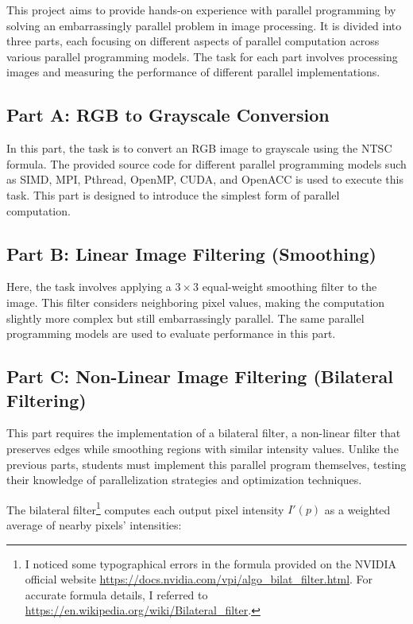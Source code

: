 \documentclass[12pt,a4paper]{report}
\begin{document}
This project aims to provide hands-on experience with parallel programming by solving an embarrassingly parallel problem in image processing. It is divided into three parts, each focusing on different aspects of parallel computation across various parallel programming models. The task for each part involves processing images and measuring the performance of different parallel implementations.

\subsection*{Part A: RGB to Grayscale Conversion} 
    In this part, the task is to convert an RGB image to grayscale using the NTSC formula. The provided source code for different parallel programming models such as SIMD, MPI, Pthread, OpenMP, CUDA, and OpenACC is used to execute this task. This part is designed to introduce the simplest form of parallel computation.

\subsection*{Part B: Linear Image Filtering (Smoothing)} 
    Here, the task involves applying a $ 3 \times 3 $ equal-weight smoothing filter to the image. This filter considers neighboring pixel values, making the computation slightly more complex but still embarrassingly parallel. The same parallel programming models are used to evaluate performance in this part.

\subsection*{Part C: Non-Linear Image Filtering (Bilateral Filtering)} 
    This part requires the implementation of a bilateral filter, a non-linear filter that preserves edges while smoothing regions with similar intensity values. Unlike the previous parts, students must implement this parallel program themselves, testing their knowledge of parallelization strategies and optimization techniques.

    The bilateral filter\footnote{I noticed some typographical errors in the formula provided on the NVIDIA official website \url{https://docs.nvidia.com/vpi/algo_bilat_filter.html}. For accurate formula details, I referred to \url{https://en.wikipedia.org/wiki/Bilateral_filter}.} computes each output pixel intensity $I'(p)$ as a weighted average of nearby pixels' intensities:
    
\end{document}
